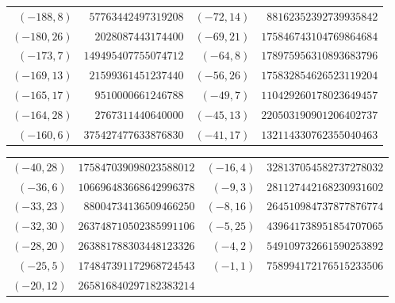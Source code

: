 {\begin{tabular}{@{}r@{\ \ }r@{\qquad}r@{\ \ }r@{}}
$(-188,8)$ & $57763442497319208$ & $(-72,14)$ & $88162352392739935842$ \\
$(-180,26)$ & $2028087443174400$ & $(-69,21)$ & $175846743104769864684$ \\
$(-173,7)$ & $149495407755074712$ & $(-64,8)$ & $178975956310893683796$ \\
$(-169,13)$ & $21599361451237440$ & $(-56,26)$ & $175832854626523119204$ \\
$(-165,17)$ & $9510000661246788$ & $(-49,7)$ & $110429260178023649457$ \\
$(-164,28)$ & $2767311440640000$ & $(-45,13)$ & $220503190901206402737$ \\
$(-160,6)$ & $375427477633876830$ & $(-41,17)$ & $132114330762355040463$ \\
\end{tabular}}\par
{\scriptsize\begin{tabular}{@{}r@{\ \ }r@{\qquad}r@{\ \ }r@{}}
$(-40,28)$ & $175847039098023588012$ & $(-16,4)$ & $328137054582737278032$ \\
$(-36,6)$ & $106696483668642996378$ & $(-9,3)$ & $281127442168230931602$ \\
$(-33,23)$ & $88004734136509466250$ & $(-8,16)$ & $264510984737877876774$ \\
$(-32,30)$ & $263748710502385991106$ & $(-5,25)$ & $439641738951854707065$ \\
$(-28,20)$ & $263881788303448123326$ & $(-4,2)$ & $549109732661590253892$ \\
$(-25,5)$ & $174847391172968724543$ & $(-1,1)$ & $758994172176515233506$ \\
$(-20,12)$ & $265816840297182383214$ & & \\
\end{tabular}}\par\medskip
